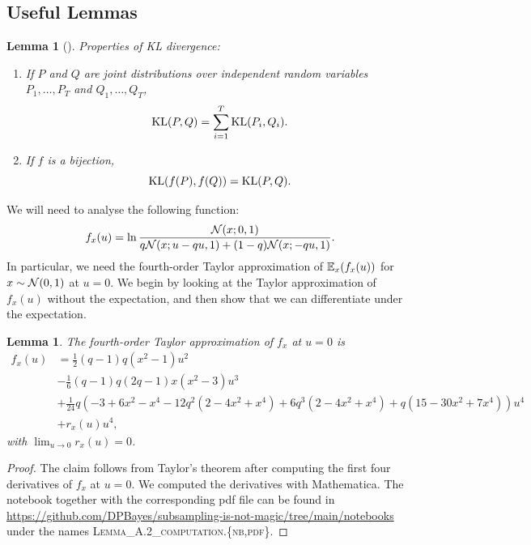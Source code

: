 \documentclass{article}
\theoremstyle{plain}
\newtheorem{lemma}[theorem]{Lemma}
\theoremstyle{definition}
\theoremstyle{remark}
\begin{document}
\subsection{Useful Lemmas}\label{app:lemmas}

\begin{lemma}[\citealp{kullbackInformationSufficiency1951}]\label{lemma:kl-div-properties}
    Properties of KL divergence:
    \begin{enumerate}
        \item If $P$ and $Q$ are joint distributions over independent random 
        variables $P_1, \dotsc, P_T$ and $Q_1, \dotsc, Q_T$,
        \begin{equation}
            \mathrm{KL}(P, Q) = \sum_{i=1}^T \mathrm{KL}(P_i, Q_i).
        \end{equation}
        \item If $f$ is a bijection, 
        \begin{equation}
            \mathrm{KL}(f(P), f(Q)) = \mathrm{KL}(P, Q).
        \end{equation}
    \end{enumerate}
\end{lemma}

We will need to analyse the following function:
\begin{equation}
    f_x(u) = \ln\frac{\mathcal{N}(x; 0, 1)}{q\mathcal{N}(x; u - qu, 1) + (1 - q)\mathcal{N}(x; -qu, 1)}.
\end{equation}
In particular, we need the fourth-order Taylor approximation of 
$\operatorname{\mathbb{E}}_x(f_x(u))$ for $x\sim \mathcal{N}(0, 1)$ at $u = 0$. We begin by 
looking at the Taylor approximation of $f_x(u)$ without the expectation,
and then show that we can differentiate under the expectation.

\begin{lemma}\label{lemma:f-taylor-approximation}
    The fourth-order Taylor approximation of $f_x$ at $u = 0$ is 
    \begin{equation}
        \begin{split}
            f_x(u) &= \frac{1}{2}(q - 1)q(x^2 - 1)u^2 
            \\&- \frac{1}{6}(q - 1)q(2q - 1)x(x^2 - 3)u^3
            \\&+ \frac{1}{24}q\left(-3 + 6x^2 - x^4 - 12q^2(2 - 4x^2 + x^4) + 6q^3(2 - 4x^2 + x^4) + q(15 - 30x^2 + 7x^4)\right)u^4
            \\&+ r_x(u)u^4,
        \end{split}
    \end{equation}
    with $\lim_{u\to 0} r_x(u) = 0$.
\end{lemma}
\begin{proof}
    The claim follows from Taylor's theorem after computing the first four derivatives 
    of $f_x$ at $u = 0$. We computed the derivatives with Mathematica.
    The notebook together with the corresponding pdf file can be found in \url{https://github.com/DPBayes/subsampling-is-not-magic/tree/main/notebooks} under the names \textsc{Lemma\_A.2\_computation.\{nb,pdf\}}.
\end{proof}
\end{document}
